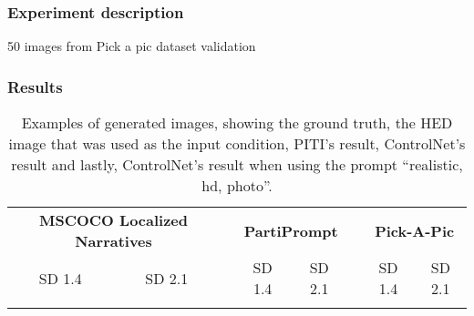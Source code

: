 
\subsubsection{Experiment description}
50 images from Pick a pic dataset validation
\subsubsection{Results}
\begin{table}[t]
    \caption{Examples of generated images, showing the ground truth, the HED image that was used as the input condition, PITI's result, ControlNet's result and lastly, ControlNet's result when using the prompt ``realistic, hd, photo''.}
    \label{tab:wuerstchen:results}
    \centering
    \begin{tabular}{cccccccc}
        \toprule
        \multicolumn{2}{c}{\textbf{MSCOCO Localized Narratives}} & \phantom{0} & \multicolumn{2}{c}{\textbf{PartiPrompt}} & \phantom{0} & \multicolumn{2}{c}{\textbf{Pick-A-Pic}}                                 \\
        \cmidrule{1-2}\cmidrule{4-5}\cmidrule{7-8}
        SD 1.4                                                   & SD 2.1      & \phantom{0}                              & SD 1.4      & SD 2.1                                  & \phantom{0} & SD 1.4 & SD 2.1 \\
        \midrule
                                                                 &             & \phantom{0}                              &             &                                         & \phantom{0} &        &        \\
        \bottomrule
    \end{tabular}
\end{table}